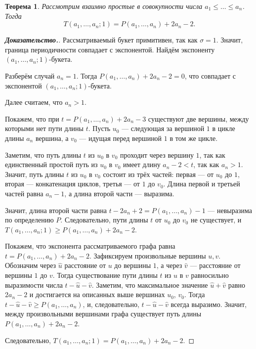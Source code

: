\documentclass[12pt]{article}
\newtheorem{theorem}{Теорема}[section]
\theoremstyle{definition}
\begin{document}
\begin{theorem}
\label{thTP}
Рассмотрим взаимно простые в совокупности числа $a_1 \le \dots \le a_n$. Тогда
\begin{equation*}
T(a_1, \dots, a_n; 1) = P(a_1, \dots, a_n) + 2a_n - 2.
\end{equation*}
\end{theorem}
\begin{proof}[\textbf{Доказательство.}]
Рассматриваемый букет примитивен, так как $\sigma = 1$. Значит, граница периодичности совпадает с экспонентой. Найдём экспоненту $(a_1, \dots, a_n; 1)$-букета.

Разберём случай $a_n = 1$. Тогда $P(a_1, \dots, a_n) + 2a_n - 2 = 0$, что совпадает с экспонентой $(a_1, \dots, a_n; 1)$-букета.

Далее считаем, что $a_n > 1$.

Покажем, что при $t = P(a_1, \dots, a_n) + 2a_n - 3$ существуют две вершины, между которыми нет пути длины $t$. Пусть $u_0$ --- следующая за вершиной $1$ в цикле длины $a_n$ вершина, а $v_0$ --- идущая перед вершиной $1$ в том же цикле.

Заметим, что путь длины $t$ из $u_0$ в $v_0$ проходит через вершину $1$, так как единственный простой путь из $u_0$ в $v_0$ имеет длину $a_n - 2 < t$, так как $a_n > 1$. Значит, путь длины $t$ из $u_0$ в $v_0$ состоит из трёх частей: первая --- от $u_0$ до $1$, вторая --- конкатенация циклов, третья --- от $1$ до $v_0$. Длина первой и третьей частей равна $a_n - 1$, а длина второй части --- выразима. 

Значит, длина второй части равна $t - 2a_n + 2 = P(a_1, \dots, a_n) - 1$ --- невыразима по определению $P$. Следовательно, пути длины $t$ от $u_0$ до $v_0$ не существует, и $T(a_1, \dots, a_n; 1) \ge P(a_1, \dots, a_n) + 2a_n - 2$.

Покажем, что экспонента рассматриваемого графа равна $t = P(a_1, \dots, a_n) + 2a_n - 2$. Зафиксируем произвольные вершины $u, v$. Обозначим через $\hat{u}$ расстояние от $u$ до вершины $1$, а через $\hat{v}$ --- расстояние от вершины $1$ до $v$. Тогда существование пути длины $t$ из $u$ в $v$ равносильно выразимости числа $t - \hat{u} - \hat{v}$. Заметим, что максимальное значение $\hat{u} + \hat{v}$ равно $2a_n - 2$ и достигается на описанных выше вершинах $u_0$, $v_0$. Тогда $t - \hat{u} - \hat{v} \ge P(a_1, \dots, a_n)$, и, следовательно, $t - \hat{u} - \hat{v}$ всегда выразимо. Значит, между произвольными вершинами графа существует путь длины $P(a_1, \dots, a_n) + 2a_n - 2$.

Следовательно, $T(a_1, \dots, a_n; 1) = P(a_1, \dots, a_n) + 2a_n - 2$.
\end{proof}
\end{document}
